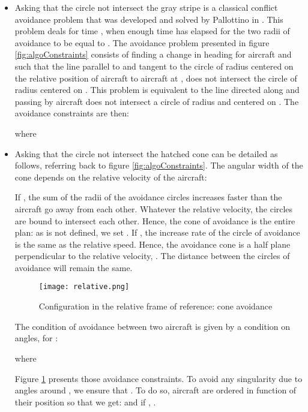 \documentclass[a4paper, 10pt]{IEEEtran}
\begin{document}
\begin{itemize}
 \item Asking that the circle  not intersect the gray stripe is a classical conflict avoidance problem that was developed and solved by Pallottino in \cite{PallottinoConflitResolution}. This problem deals for time , when enough time has elapsed for the two radii of avoidance to be equal to . 
The avoidance problem presented in figure \ref{fig:algoConstraints} consists of finding a change in heading for aircraft  and  such that the line parallel to  and tangent to the circle of radius  centered on the relative position of aircraft  to aircraft  at , does not intersect the circle of radius  centered on . 
This problem is equivalent to  the line directed along  and passing by aircraft  does not intersect a circle of radius  and centered on . 
The avoidance constraints are then:
 
where 


\item Asking that the circle   not intersect the hatched cone can be detailed as follows, referring back to figure \ref{fig:algoConstraints}. The angular width  of the cone depends on the relative velocity of the aircraft: 

If , the sum of the radii of the avoidance circles increases faster than the aircraft go away from each other. Whatever the relative velocity, the circles are bound to intersect each other. Hence, the cone of avoidance is the entire plan: as  is not defined, we set .  If , the increase rate of the circle of avoidance is the same as the relative speed. Hence, the avoidance cone is a half plane perpendicular to the relative velocity, . The distance between the circles of avoidance will remain the same.
\begin{figure}[ht]
\centering
    \texttt{[image: relative.png]}
    \caption{Configuration in the relative frame of reference: cone avoidance}
\label{fig:coneAvoidance}
\end{figure}
The condition of avoidance between two aircraft is given by a condition on angles, for :


where

Figure \ref{fig:coneAvoidance} presents those avoidance constraints. To avoid any singularity due to angles around , we ensure that . To do so, aircraft are ordered in function of their position  so that we get:  and if , .
\end{itemize}
\end{document}
